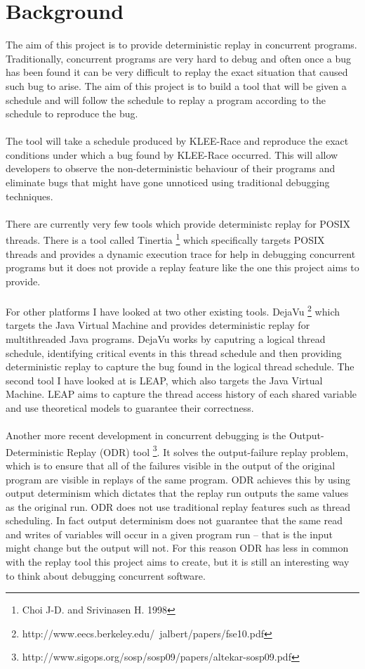 \documentclass[a4paper,11pt]{article}
\begin{document}
\section{Background}
The aim of this project is to provide deterministic replay in concurrent programs. Traditionally, concurrent programs are very hard to debug and often once a bug has been found it can be very difficult to replay the exact situation that caused such bug to arise. The aim of this project is to build a tool that will be given a schedule and will follow the schedule to replay a program according to the schedule to reproduce the bug.
\\
\\
The tool will take a schedule produced by KLEE-Race and reproduce the exact conditions under which a bug found by KLEE-Race occurred. This will allow developers to observe the non-deterministic behaviour of their programs and eliminate bugs that might have gone unnoticed using traditional debugging techniques.
\\
\\
There are currently very few tools which provide deterministc replay for POSIX threads. There is a tool called Tinertia \footnote{Choi J-D. and Srivinasen H. 1998} which specifically targets POSIX threads and provides a dynamic execution trace for help in debugging concurrent programs but it does not provide a replay feature like the one this project aims to provide. 
\\
\\
For other platforms I have looked at two other existing tools. DejaVu \footnote{http://www.eecs.berkeley.edu/\string~jalbert/papers/fse10.pdf} which targets the Java Virtual Machine and provides deterministic replay for multithreaded Java programs. DejaVu works by caputring a logical thread schedule, identifying critical events in this thread schedule and then providing deterministic replay to capture the bug found in the logical thread schedule. The second tool I have looked at is LEAP, which also targets the Java Virtual Machine. LEAP aims to capture the thread access history of each shared variable and use theoretical models to guarantee their correctness.
\\
\\
Another more recent development in concurrent debugging is the Output-Deterministic Replay (ODR) tool \footnote{http://www.sigops.org/sosp/sosp09/papers/altekar-sosp09.pdf}. It solves the output-failure replay problem, which is to ensure that all of the failures visible in the output of the original program are visible in replays of the same program. ODR achieves this by using output determinism which dictates that the replay run outputs the same values as the original run. ODR does not use traditional replay features such as thread scheduling. In fact output determinism does not guarantee that the same read and writes of variables will occur in a given program run -- that is the input might change but the output will not. For this reason ODR has less in common with the replay tool this project aims to create, but it is still an interesting way to think about debugging concurrent software.
\end{document}

